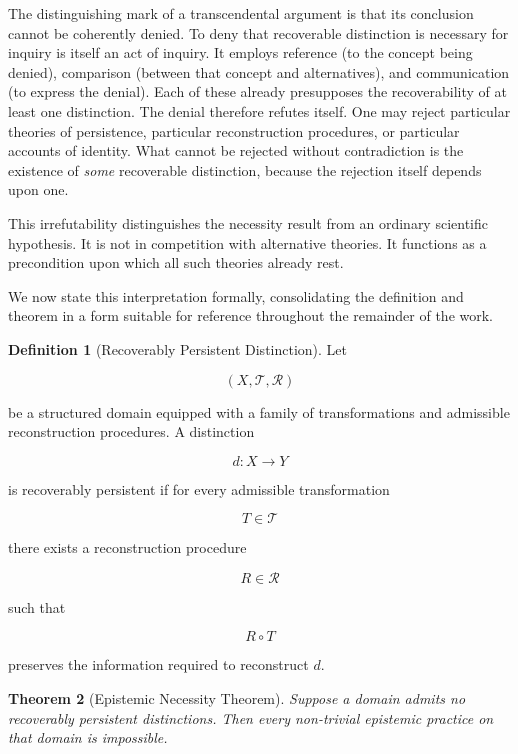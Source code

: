 \documentclass[12pt,oneside]{article}
\newtheorem{theorem}{Theorem}[section] \newtheorem{lemma}[theorem]{Lemma} \newtheorem{proposition}[theorem]{Proposition} \newtheorem{corollary}[theorem]{Corollary}
\theoremstyle{definition}
\newtheorem{definition}[theorem]{Definition} \newtheorem{axiom}[theorem]{Axiom} \newtheorem{remark}[theorem]{Remark} \newtheorem{example}[theorem]{Example}
\begin{document}
The distinguishing mark of a transcendental argument is that its conclusion cannot
be coherently denied. To deny that recoverable distinction is necessary for inquiry
is itself an act of inquiry. It employs reference (to the concept being denied),
comparison (between that concept and alternatives), and communication (to express
the denial). Each of these already presupposes the recoverability of at least one
distinction. The denial therefore refutes itself. One may reject particular theories
of persistence, particular reconstruction procedures, or particular accounts of
identity. What cannot be rejected without contradiction is the existence of
\emph{some} recoverable distinction, because the rejection itself depends upon one.

This irrefutability distinguishes the necessity result from an ordinary scientific
hypothesis. It is not in competition with alternative theories. It functions as a
precondition upon which all such theories already rest.

We now state this interpretation formally, consolidating the definition and theorem
in a form suitable for reference throughout the remainder of the work.

\begin{definition}[Recoverably Persistent Distinction]

Let

\[
(X,\mathcal{T},\mathcal{R})
\]

be a structured domain equipped with a family of transformations and admissible reconstruction procedures. A distinction

\[
d:X\rightarrow Y
\]

is recoverably persistent if for every admissible transformation

\[
T\in\mathcal{T}
\]

there exists a reconstruction procedure

\[
R\in\mathcal{R}
\]

such that

\[
R\circ T
\]

preserves the information required to reconstruct \(d\).

\end{definition}

\begin{theorem}[Epistemic Necessity Theorem]

Suppose a domain admits no recoverably persistent distinctions. Then every non-trivial epistemic practice on that domain is impossible.

\end{theorem}
\end{document}
